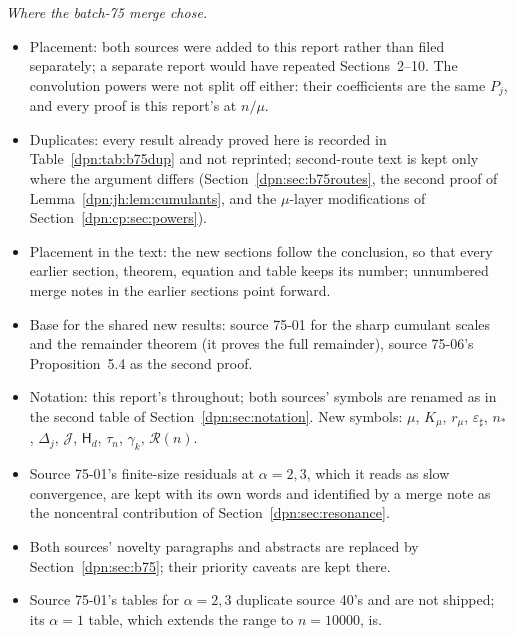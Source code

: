 \documentclass[11pt]{article}
\numberwithin{equation}{section}
\theoremstyle{definition}\newtheorem{definition}[theorem]{Definition}
\theoremstyle{remark}\newtheorem{remark}[theorem]{Remark}
\newcommand{\epsh}{\varepsilon_{\sharp}}
\begin{document}
\emph{Where the batch-75 merge chose.}
\begin{itemize}
\item Placement: both sources were added to this report rather than filed
      separately; a separate report would have repeated Sections~2--10.  The
      convolution powers were not split off either: their coefficients are
      the same $P_j$, and every proof is this report's at $n/\mu$.
\item Duplicates: every result already proved here is recorded in
      Table~\ref{dpn:tab:b75dup} and not reprinted; second-route text is kept
      only where the argument differs (Section~\ref{dpn:sec:b75routes}, the
      second proof of Lemma~\ref{dpn:jh:lem:cumulants}, and the $\mu$-layer
      modifications of Section~\ref{dpn:cp:sec:powers}).
\item Placement in the text: the new sections follow the conclusion, so that
      every earlier section, theorem, equation and table keeps its number;
      unnumbered merge notes in the earlier sections point forward.
\item Base for the shared new results: source 75-01 for the sharp cumulant
      scales and the remainder theorem (it proves the full remainder),
      source 75-06's Proposition~5.4 as the second proof.
\item Notation: this report's throughout; both sources' symbols are renamed as
      in the second table of Section~\ref{dpn:sec:notation}.  New symbols:
      $\mu$, $K_\mu$, $r_\mu$, $\epsh$, $n_*$, $\Delta_j$, $\mathcal J$,
      $\mathsf H_d$, $\tau_n$, $\gamma_k$, $\mathcal R(n)$.
\item Source 75-01's finite-size residuals at $\alpha=2,3$, which it reads as
      slow convergence, are kept with its own words and identified by a merge
      note as the noncentral contribution of Section~\ref{dpn:sec:resonance}.
\item Both sources' novelty paragraphs and abstracts are replaced by
      Section~\ref{dpn:sec:b75}; their priority caveats are kept there.
\item Source 75-01's tables for $\alpha=2,3$ duplicate source 40's and are not
      shipped; its $\alpha=1$ table, which extends the range to $n=10000$, is.
\end{itemize}
\end{document}

